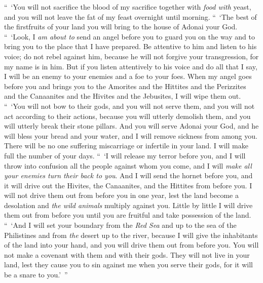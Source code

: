 \begin{biblechapter}
\verse “ ‘You will not sacrifice the blood of my sacrifice together with \textit{food with} yeast, and you will not leave the fat of my feast overnight until morning.
\verse “ ‘The best of the firstfruits of your land you will bring to the house of Adonai your God.
 “ ‘Look, I \textit{am about to} send an angel before you to guard you on the way and to bring you to the place that I have prepared.
\verse Be attentive to him and listen to his voice; do not rebel against him, because he will not forgive your transgression, for my name is in him.
\verse But if you listen attentively to his voice and do all that I say, I will be an enemy to your enemies and a foe to your foes.
\verse When my angel goes before you and brings you to the Amorites and the Hittites and the Perizzites and the Canaanites and the Hivites and the Jebusites, I will wipe them out.
\verse “ ‘You will not bow to their gods, and you will not serve them, and you will not act according to their actions, because you will utterly demolish them, and you will utterly break their stone pillars.
\verse And you will serve Adonai your God, and he will bless your bread and your water, and I will remove sickness from among you.
\verse There will be no one suffering miscarriage or infertile in your land. I will make full the number of your days.
\verse “ ‘I will release my terror before you, and I will throw into confusion all the people against whom you come, and I will \textit{make all your enemies turn their back to you}.
\verse And I will send the hornet before you, and it will drive out the Hivites, the Canaanites, and the Hittites from before you.
\verse I will not drive them out from before you in one year, lest the land become a desolation and \textit{the wild animals} multiply against you.
\verse Little by little I will drive them out from before you until you are fruitful and take possession of the land.
\verse “ ‘And I will set your boundary from the \textit{Red Sea} and up to the sea of the Philistines and from \textit{the} desert up to the river, because I will give the inhabitants of the land into your hand, and you will drive them out from before you.
\verse You will not make a covenant with them and with their gods.
\verse They will not live in your land, lest they cause you to sin against me when you serve their gods, for it will be a snare to you.’ ”
\end{biblechapter}

